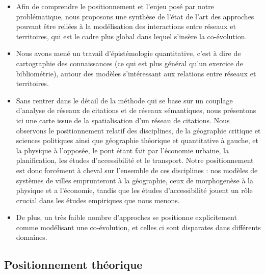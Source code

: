 \documentclass[11pt]{article}
\begin{document}
\begin{itemize}
	\item Afin de comprendre le positionnement et l'enjeu posé par notre problématique, nous proposons une synthèse de l'état de l'art des approches pouvant être reliées à la modélisation des interactions entre réseaux et territoires, qui est le cadre plus global dans lequel s'insère la co-évolution.
	\item Nous avons mené un travail d'épistémologie quantitative, c'est à dire de cartographie des connaissances (ce qui est plus général qu'un exercice de bibliométrie), autour des modèles s'intéressant aux relations entre réseaux et territoires.
	\item Sans rentrer dans le détail de la méthode qui se base sur un couplage d'analyse de réseaux de citations et de réseaux sémantiques, nous présentons ici une carte issue de la spatialisation d'un réseau de citations. Nous observons le positionnement relatif des disciplines, de la géographie critique et sciences politiques ainsi que géographie théorique et quantitative à gauche, et la physique à l'opposée, le pont étant fait par l'économie urbaine, la planification, les études d'accessibilité et le transport. Notre positionnement est donc forcément à cheval sur l'ensemble de ces disciplines : nos modèles de systèmes de villes emprunteront à la géographie, ceux de morphogenèse à la physique et a l'économie, tandis que les études d'accessibilité jouent un rôle crucial dans les études empiriques que nous menons.
	\item De plus, un très faible nombre d'approches se positionne explicitement comme modélisant une co-évolution, et celles ci sont disparates dans différents domaines.
\end{itemize}




\subsection*{Positionnement théorique}
\end{document}
